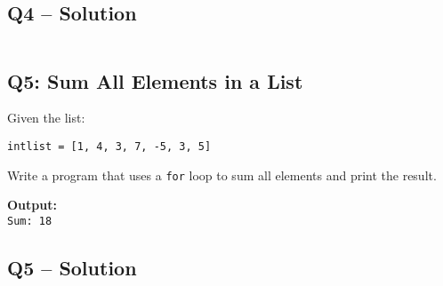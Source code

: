 \documentclass[a4paper,11pt]{article}
\begin{document}
		
	\subsection*{Q4 – Solution}
	\inputminted{python}{Files/3/4.py}
	
	\subsection*{Q5: Sum All Elements in a List}
	Given the list:
	
	\texttt{intlist = [1, 4, 3, 7, -5, 3, 5]}
	
	Write a program that uses a \texttt{for} loop to sum all elements and print the result.
	
	\textbf{Output:}\\
	\texttt{Sum: 18}
	

	
	\subsection*{Q5 – Solution}
	\inputminted{python}{Files/3/5.py}
	
		
	


	





	
	
\end{document}
